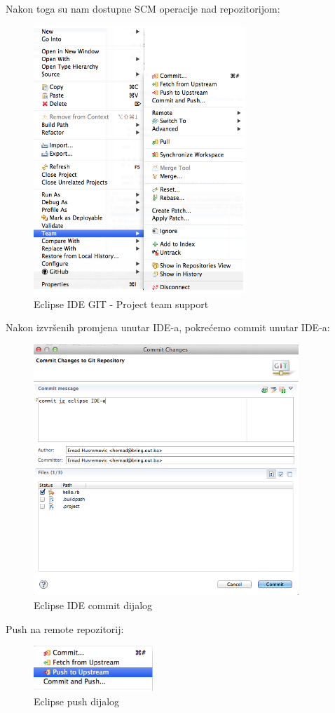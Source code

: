 \documentclass[times, utf8, seminar]{fit}
\begin{document}
\begin{itemize}
Nakon toga su nam dostupne SCM operacije nad repozitorijom:
\begin{figure}[H]
\centering
\includegraphics[width=8cm]{img/eclipse_git_02.png}
\caption{Eclipse IDE GIT - Project team support}
\end{figure}

Nakon izvršenih promjena unutar IDE-a, pokrećemo commit unutar IDE-a:
\begin{figure}[H]
\centering
\includegraphics[width=10cm]{img/eclipse_git_03.png}
\caption{Eclipse IDE commit dijalog}
\end{figure}

Push na remote repozitorij:

\begin{figure}[H]
\centering
\includegraphics[width=4.5cm]{img/eclipse_git_04.png}
\caption{Eclipse push dijalog}
\end{figure}


\end{itemize}
\end{document}

